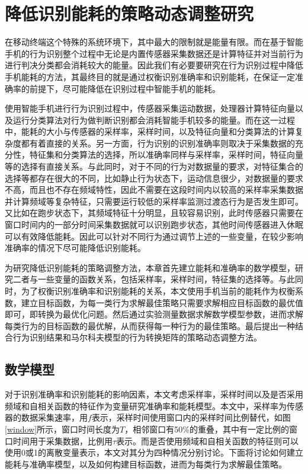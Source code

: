 \chapter{降低识别能耗的策略动态调整研究}
\par 在移动终端这个特殊的系统环境下，其中最大的限制就是能量有限。而在基于智能手机的行为识别整个过程中无论是内置传感器采集数据还是计算特征并对当前行为进行判决分类都会消耗较大的能量。因此我们有必要要研究在行为识别过程中降低手机能耗的方法，其最终目的就是通过权衡识别准确率和识别能耗，在保证一定准确率的前提下，尽可能降低在识别过程中智能手机的能耗。
\par 使用智能手机进行行为识别过程中，传感器采集运动数据，处理器计算特征向量以及运行分类算法对行为做判断识别都会消耗智能手机较多的能量。而在这一过程中，能耗的大小与传感器的采样率，采样时间，以及特征向量和分类算法的计算复杂度都有着直接的关系。另一方面，行为识别的识别准确率则取决于采集数据的充分性，特征集和分类算法的选择，所以准确率同样与采样率，采样时间，特征向量等的选择有直接关系。与此同时，对于不同的行为对数据量的要求，对特征集合的选择等都存在很大的不同，比如静止行为状态下，运动信息很少，对数据量的要求不高，而且也不存在频域特性，因此不需要在这段时间内以较高的采样率采集数据并计算频域等复杂特征，只需要运行较低的采样率监测过渡态行为是否发生即可。又比如在跑步状态下，其频域特征十分明显，且较容易识别，此时传感器只需要在窗口时间内的一部分时间采集数据就可以识别跑步状态，其他时间传感器进入休眠可以有效降低能耗。因此可以针对不同行为通过调节上述的一些变量，在较少影响准确率的情况下尽可能降低识别能耗。
\par 为研究降低识别能耗的策略调整方法，本章首先建立能耗和准确率的数学模型，研究二者与一些变量的函数关系，包括采样率，采样时间，特征集的选择等。与此同时，为了权衡识别准确率和识别能耗的关系，本文使用手机当前的能耗作为权衡系数，建立目标函数，为每一类行为求解最佳策略只需要求解相应目标函数的最优值即可，即转换为最优化问题。然后通过实验测量数据求解数学模型参数，进而求解每类行为的目标函数的最优解，从而获得每一种行为的最佳策略。最后提出一种结合行为识别结果和马尔科夫模型的行为转换矩阵的策略动态调整方法。

\section{数学模型}
\par 对于识别准确率和识别能耗的影响因素，本文考虑采样率，采样时间以及是否采用频域和自相关函数的特征作为变量研究准确率和能耗模型。本文中，采样率为传感器的数据采集速率，用$f$表示，采样时间使用窗口内的采样时间比例替代，如图\ref{window}所示，窗口时间长度为$T$，相邻窗口有50\%的重叠，其中有一定比例的窗口时间用于采集数据，比例用$\tau$表示。而是否使用频域和自相关函数的特征则可以使用0或1的离散变量表示，本文对其分为四种情况分别讨论。下面将讨论如何建立能耗与准确率模型，以及如何构建目标函数，进而为每类行为求解最佳策略。

